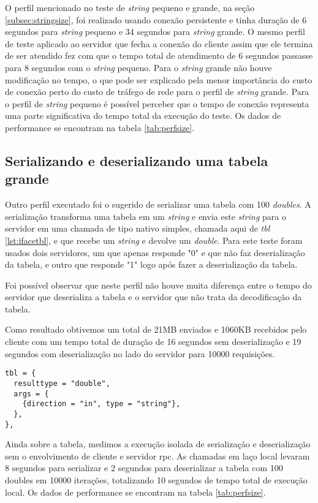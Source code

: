 \documentclass[11pt]{article}
\begin{document}
O perfil mencionado no teste de \textit{string} pequeno e grande, na seção
\ref{subsec:stringsize}, foi realizado usando conexão persistente e tinha
duração de 6 segundos para \textit{string} pequeno e 34 segundos para
\textit{string} grande. O mesmo perfil de teste aplicado ao servidor que fecha a
conexão do cliente assim que ele termina de ser atendido fez com que o tempo
total de atendimento de 6 segundos passasse para 8 segundos com o
\textit{string} pequeno. Para o \textit{string} grande não houve modificação no
tempo, o que pode ser explicado pela menor importância do custo de conexão perto
do custo de tráfego de rede para o perfil de \textit{string} grande. Para o
perfil de \textit{string} pequeno é possível perceber que o tempo de conexão
representa uma parte significativa do tempo total da execução do teste. Os dados
de performance se encontram na tabela \ref{tab:perfsize}.

\subsection{Serializando e deserializando uma tabela grande}\label{subsec:serdeser}

Outro perfil executado foi o sugerido de serializar uma tabela com 100
\textit{doubles}. A serialização transforma uma tabela em um \textit{string} e
envia este \textit{string} para o servidor em uma chamada de tipo nativo
simples, chamada aqui de \textit{tbl} \ref{lst:ifacetbl}, e que recebe um
\textit{string} e devolve um \textit{double}. Para este teste foram usados dois
servidores, um que apenas responde "0" e que não faz deserialização da tabela, e
outro que responde "1" logo após fazer a deserialização da tabela.

Foi possível observar que neste perfil não houve muita diferença entre o tempo
do servidor que deserializa a tabela e o servidor que não trata da decodificação
da tabela.

Como resultado obtivemos um total de 21MB enviados e 1060KB recebidos pelo
cliente com um tempo total de duração de 16 segundos sem deserialização e 19
segundos com deserialização no lado do servidor para 10000 requisições.

\begin{lstlisting}[caption={Interface tbl},label={lst:ifacetbl}]
tbl = {
  resulttype = "double",
  args = {
    {direction = "in", type = "string"},
  },
},
\end{lstlisting}

Ainda sobre a tabela, medimos a execução isolada de serialização e
deserialização sem o envolvimento de cliente e servidor \gls{rpc}. As chamadas
em laço local levaram 8 segundos para serializar e 2 segundos para deserializar
a tabela com 100 doubles em 10000 iterações, totalizando 10 segundos de tempo
total de execução local. Os dados de performance se encontram na tabela
\ref{tab:perfsize}.
\end{document}
